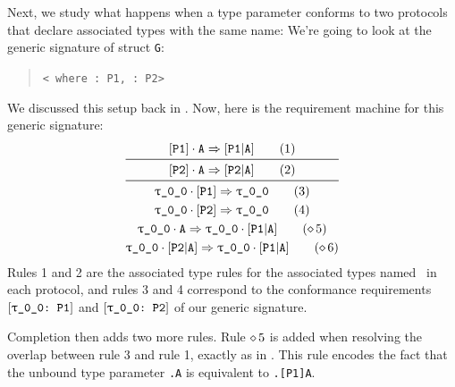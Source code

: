 \documentclass[../generics]{subfiles}
\begin{document}
\begin{example}\label{two protocols same assoc}
Next, we study what happens when a type parameter conforms to two protocols that declare associated types with the same name:
We're going to look at the generic signature of struct \texttt{G}:
\begin{quote}
\texttt{<\rT\ where \rT:~P1, \rT:~P2>}
\end{quote}
We discussed this setup back in . Now, here is the requirement machine for this generic signature:
\begin{gather*}
\AssocIntro{P1}{A}\tag{1}\\
\midrule
\AssocIntro{P2}{A}\tag{2}\\
\midrule
\ProtoConf{\rT}{P1}\tag{3}\\
\ProtoConf{\rT}{P2}\tag{4}\\
\rT\cdot\nA\Red\rT\cdot\assocsym{P1}{A}\tag{$\CRule{5}$}\\
\rT\cdot\assocsym{P2}{A}\Red\rT\cdot\assocsym{P1}{A}\tag{$\CRule{6}$}
\end{gather*}
Rules 1 and 2 are the associated type rules for the associated types named \nA\ in each protocol, and rules 3 and 4 correspond to the conformance requirements $\ConfReq{\rT}{P1}$ and $\ConfReq{\rT}{P2}$ of our generic signature.

Completion then adds two more rules. Rule $\diamond\, 5$ is added when resolving the overlap between rule 3 and rule 1, exactly as in . This rule encodes the fact that the unbound type parameter \texttt{\rT.A} is equivalent to \texttt{\rT.[P1]A}.


\end{example}
\end{document}
